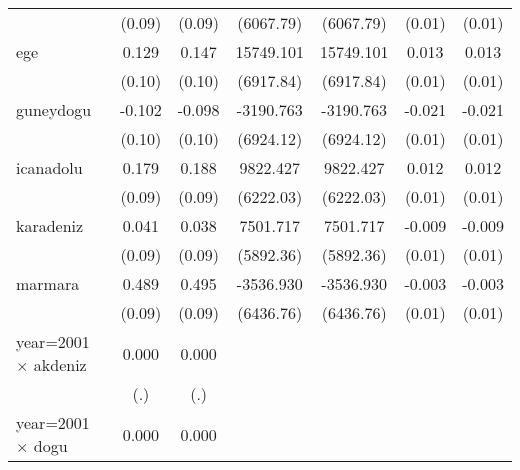 {\begin{tabular}{l*{6}{c}}
                    &      (0.09)         &      (0.09)         &   (6067.79)         &   (6067.79)         &      (0.01)         &      (0.01)         \\
ege                 &       0.129         &       0.147         &   15749.101\sym{*}  &   15749.101\sym{*}  &       0.013         &       0.013         \\
                    &      (0.10)         &      (0.10)         &   (6917.84)         &   (6917.84)         &      (0.01)         &      (0.01)         \\
guneydogu           &      -0.102         &      -0.098         &   -3190.763         &   -3190.763         &      -0.021\sym{**} &      -0.021\sym{**} \\
                    &      (0.10)         &      (0.10)         &   (6924.12)         &   (6924.12)         &      (0.01)         &      (0.01)         \\
icanadolu           &       0.179\sym{*}  &       0.188\sym{*}  &    9822.427         &    9822.427         &       0.012         &       0.012         \\
                    &      (0.09)         &      (0.09)         &   (6222.03)         &   (6222.03)         &      (0.01)         &      (0.01)         \\
karadeniz           &       0.041         &       0.038         &    7501.717         &    7501.717         &      -0.009         &      -0.009         \\
                    &      (0.09)         &      (0.09)         &   (5892.36)         &   (5892.36)         &      (0.01)         &      (0.01)         \\
marmara             &       0.489\sym{***}&       0.495\sym{***}&   -3536.930         &   -3536.930         &      -0.003         &      -0.003         \\
                    &      (0.09)         &      (0.09)         &   (6436.76)         &   (6436.76)         &      (0.01)         &      (0.01)         \\
year=2001 $\times$ akdeniz&       0.000         &       0.000         &                     &                     &                     &                     \\
                    &         (.)         &         (.)         &                     &                     &                     &                     \\
year=2001 $\times$ dogu&       0.000         &       0.000         &                     &                     &                     &                     \\

\end{tabular}}
